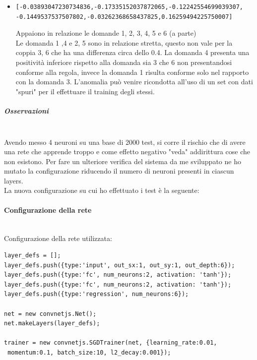 \documentclass[10pt,a4paper]{article}
\begin{document}
\begin{itemize}
\item  \begin{verbatim}[-0.03893047230734836,-0.17335152037872065,-0.12242554699039307,
-0.1449537537507802,-0.03262368658437825,0.16259494225750007]\end{verbatim}
Appaiono in relazione le domande 1, 2, 3, 4, 5  e 6 (a parte)\\
Le domanda 1 ,4 e 2, 5  sono in relazione stretta, questo non vale per la coppia 3, 6 che ha una differenza circa dello 0.4. La domanda 4 presenta una positivit\`a inferiore rispetto alla domanda sia 3 che 6 non presentandosi conforme alla regola, invece la domanda 1 risulta conforme solo nel rapporto con la domanda 3. L'anomalia pu\`o venire ricondotta all'uso di un set con dati "spuri" per il effettuare il training degli stessi.
\end{itemize}

\subparagraph{Osservazioni}\mbox{}
\label{Osservazioni su rete a 4 neuroni}
\\
Avendo messo 4 neuroni su una base di 2000 test, si corre il rischio che di avere una rete che apprende troppo e come effetto negativo "veda" addirittura cose che non esistono.
Per fare un ulteriore verifica del sistema da me sviluppato ne ho mutato la configurazione riducendo il numero di neuroni presenti in ciascun layers.\\
La nuova configurazione su cui ho effettuato i test \`e la seguente:

\paragraph{Configurazione della rete}\mbox{}
\label{Configurazione della rete 2 neuroni per 2 layers}
\\
Configurazione della rete utilizzata:\\
\begin{verbatim}layer_defs = [];
layer_defs.push({type:'input', out_sx:1, out_sy:1, out_depth:6});
layer_defs.push({type:'fc', num_neurons:2, activation: 'tanh'});
layer_defs.push({type:'fc', num_neurons:2, activation: 'tanh'});
layer_defs.push({type:'regression', num_neurons:6});

net = new convnetjs.Net();
net.makeLayers(layer_defs);

trainer = new convnetjs.SGDTrainer(net, {learning_rate:0.01,
 momentum:0.1, batch_size:10, l2_decay:0.001});
\end{verbatim}
\end{document}
